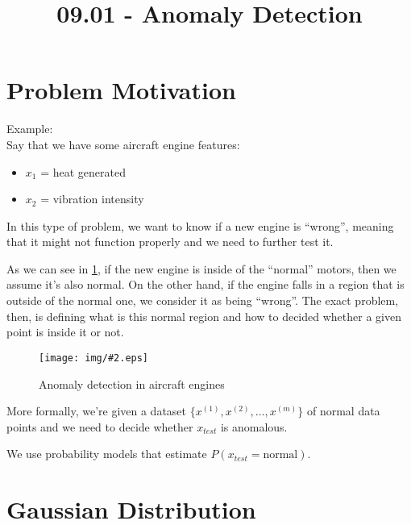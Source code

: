 \documentclass[10pt]{extarticle}
\newcommand{\stdfig}[3]{
    \begin{figure}
    \centering
    \texttt{[image: img/\#2.eps]}
    \caption{#3}
    \label{fig:#2}
    \end{figure}
}
\begin{document}
 



\title{09.01 - Anomaly Detection}

    
    \date{}
    

    

    \maketitle

\newpage





\section{Problem Motivation}\label{problem-motivation}

Example:\\Say that we have some aircraft engine features:

\begin{itemize}
\itemsep1pt\parskip0pt
\item
  $x_1$ = heat generated
\item
  $x_2$ = vibration intensity
\end{itemize}

In this type of problem, we want to know if a new engine is ``wrong'',
meaning that it might not function properly and we need to further test
it.

As we can see in \cref{fig:aircraft_engines}, if the new engine is
inside of the ``normal'' motors, then we assume it's also normal. On the
other hand, if the engine falls in a region that is outside of the
normal one, we consider it as being ``wrong''. The exact problem, then,
is defining what is this normal region and how to decided whether a
given point is inside it or not. \bigskip

\stdfig{8cm}{aircraft_engines}{Anomaly detection in aircraft engines}

More formally, we're given a dataset
$\{x^{(1)}, x^{(2)}, \dots, x^{(m)}\}$ of normal data points and we need
to decide whether $x_{test}$ is anomalous.

We use probability models that estimate $P(x_{test} = \text{normal})$.

\section{Gaussian Distribution}\label{gaussian-distribution}
\end{document}
